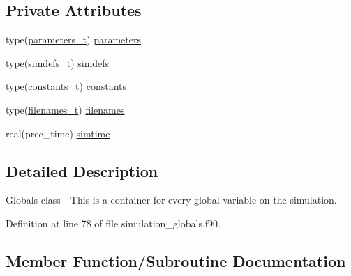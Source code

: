 \subsection*{Private Attributes}
\begin{DoxyCompactItemize}
\item 
type(\mbox{\hyperlink{structsimulation__globals__mod_1_1parameters__t}{parameters\+\_\+t}}) \mbox{\hyperlink{structsimulation__globals__mod_1_1globals__class_aef60024afa0a128d0af3d8a47a732657}{parameters}}
\item 
type(\mbox{\hyperlink{structsimulation__globals__mod_1_1simdefs__t}{simdefs\+\_\+t}}) \mbox{\hyperlink{structsimulation__globals__mod_1_1globals__class_aa066434c9dc6147331dce613422568ae}{simdefs}}
\item 
type(\mbox{\hyperlink{structsimulation__globals__mod_1_1constants__t}{constants\+\_\+t}}) \mbox{\hyperlink{structsimulation__globals__mod_1_1globals__class_af178aeb39fefa2c7dec6a74faa04819c}{constants}}
\item 
type(\mbox{\hyperlink{structsimulation__globals__mod_1_1filenames__t}{filenames\+\_\+t}}) \mbox{\hyperlink{structsimulation__globals__mod_1_1globals__class_abb5045218897afcf2ccc51f63dc38761}{filenames}}
\item 
real(prec\+\_\+time) \mbox{\hyperlink{structsimulation__globals__mod_1_1globals__class_ab28ea8e0cca87c11a33e4acfb3d3b293}{simtime}}
\end{DoxyCompactItemize}


\subsection{Detailed Description}
Globals class -\/ This is a container for every global variable on the simulation. 

Definition at line 78 of file simulation\+\_\+globals.\+f90.



\subsection{Member Function/\+Subroutine Documentation}
\mbox{\label{structsimulation__globals__mod_1_1globals__class_a9438f8bdec469e7cbf9b898a398f9745}} 
